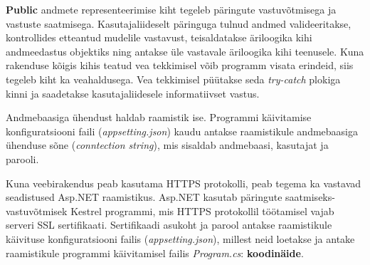 \textbf{Public} andmete representeerimise kiht tegeleb päringute vastuvõtmisega ja vastuste saatmisega. Kasutajaliideselt päringuga 
tulnud andmed valideeritakse, kontrollides etteantud mudelile vastavust, teisaldatakse äriloogika kihi andmeedastus objektiks
ning antakse üle vastavale äriloogika kihi teenusele. Kuna rakenduse kõigis kihis teatud vea tekkimisel võib programm visata erindeid,
siis tegeleb kiht ka veahaldusega. Vea tekkimisel püütakse seda \textit{try-catch} plokiga kinni ja saadetakse kasutajaliidesele informatiivset
vastus.

Andmebaasiga ühendust haldab raamistik ise. Programmi käivitamise konfiguratsiooni faili (\textit{appsetting.json}) kaudu
antakse raamistikule andmebaasiga ühenduse sõne (\textit{conntection string}), mis sisaldab andmebaasi, kasutajat ja parooli.

Kuna veebirakendus peab kasutama HTTPS protokolli, peab tegema ka vastavad seadistused Asp.NET raamistikus. Asp.NET kasutab päringute
saatmiseks-vastuvõtmisek Kestrel programmi, mis HTTPS protokollil töötamisel vajab serveri SSL sertifikaati. Sertifikaadi
asukoht ja parool antakse raamistikule käivituse konfiguratsiooni failis (\textit{appsetting.json}), millest neid loetakse
ja antake raamistikule programmi käivitamisel failis \textit{Program.cs}: \textbf{koodinäide}.





